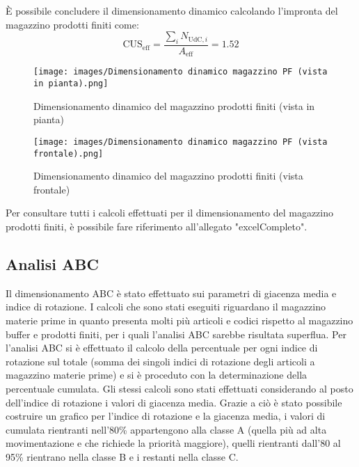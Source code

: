 \documentclass[11pt]{article}
\begin{document}
\noindent
È possibile concludere il dimensionamento dinamico calcolando l'impronta del magazzino prodotti finiti come:
\begin{equation}
    \text{CUS}_\text{eff} = \frac{\sum_i N_{\text{UdC},i}}{A_\text{eff}} = 1.52
\end{equation}

\begin{figure}[H]
    \centering
    \texttt{[image: images/Dimensionamento dinamico magazzino PF (vista in pianta).png]}
    \caption{Dimensionamento dinamico del magazzino prodotti finiti (vista in pianta)}
    \label{fig: Dimensionamento dinamico del magazzino prodotti finiti (vista in pianta)}
\end{figure}

\begin{figure}[H]
    \centering
    \texttt{[image: images/Dimensionamento dinamico magazzino PF (vista frontale).png]}
    \caption{Dimensionamento dinamico del magazzino prodotti finiti (vista frontale)}
    \label{fig: Dimensionamento dinamico del magazzino prodotti finiti (vista frontale)}
\end{figure}

\noindent
Per consultare tutti i calcoli effettuati per il dimensionamento del magazzino prodotti finiti, è possibile fare riferimento all'allegato "{{excelCompleto}}".
\newpage

\subsection{Analisi ABC}
Il dimensionamento ABC è stato effettuato sui parametri di giacenza media e indice di rotazione. I calcoli che sono stati eseguiti riguardano il magazzino materie prime in quanto presenta molti più articoli e codici rispetto al magazzino buffer e prodotti finiti, per i quali l'analisi ABC sarebbe risultata superflua.
Per l'analisi ABC si è effettuato il calcolo della percentuale per ogni indice di rotazione sul totale (somma dei singoli indici di rotazione degli articoli a magazzino materie prime) e si è proceduto con la determinazione della percentuale cumulata. Gli stessi calcoli sono stati effettuati considerando al posto dell'indice di rotazione i valori di giacenza media.
Grazie a ciò è stato possibile costruire un grafico per l'indice di rotazione e la giacenza media, i valori di cumulata rientranti nell'80\% appartengono alla classe A (quella più ad alta movimentazione e che richiede la priorità maggiore), quelli rientranti dall'80 al 95\% rientrano nella classe B e i restanti nella classe C.
\end{document}
